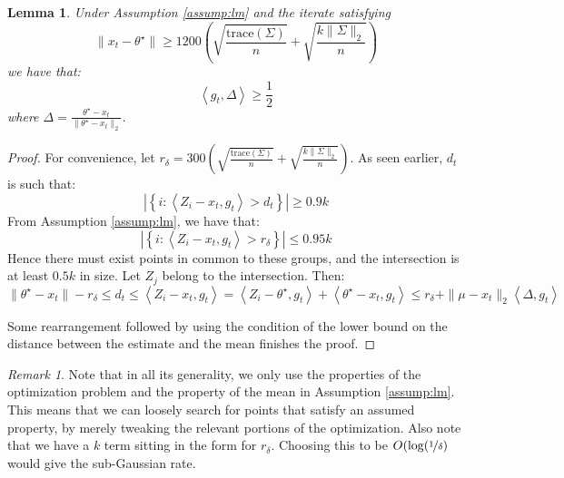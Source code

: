 \documentclass{article}
\newtheorem{lemma}{Lemma}
\theoremstyle{remark}
\newtheorem*{remark}{Remark}
\theoremstyle{defintiion}
\newcommand{\inner}[2]{\left\langle #1, #2 \right\rangle}
\newcommand{\trace}{\mathrm{trace}}
\newcommand{\tparam}{\theta^{\star}}
\begin{document}
\begin{lemma}
Under Assumption \ref{assump:lm} and the iterate satisfying
\begin{equation*}
\|x_{t} - \tparam\| \geq 1200\left(\sqrt{\frac{\trace(\Sigma)}{n}} + \sqrt{\frac{k\|\Sigma\|_{2}}{n}}\right)
\end{equation*}
we have that:
\begin{equation*}
\inner{g_{t}}{\Delta} \geq \frac{1}{2}
\end{equation*}
where \(\Delta = \frac{\tparam - x_{t}}{\|\tparam - x_{t}\|_{2}}\).
\end{lemma}

\begin{proof}
For convenience, let \(r_{\delta} = 300\left(\sqrt{\frac{\trace(\Sigma)}{n}} + \sqrt{\frac{k\|\Sigma\|_{2}}{n}}\right)\).
As seen earlier, \(d_{t}\) is such that:
\begin{equation*}
\left|\left\{i : \inner{Z_{i} - x_{t}}{g_{t}} > d_{t}\right\}\right| \geq 0.9k
\end{equation*}
From Assumption \ref{assump:lm}, we have that:
\begin{equation*}
\left|\left\{i : \inner{Z_{i} - x_{t}}{g_{t}} > r_{\delta}\right\}\right| \leq 0.95k
\end{equation*}
Hence there must exist points in common to these groups, and the intersection is at least \(0.5k\) in size. Let \(Z_{j}\) belong to the intersection. Then:
\begin{equation*}
\|\tparam - x_{t}\| - r_{\delta} \leq d_{t} \leq \inner{Z_{i} - x_{t}}{g_{t}} = \inner{Z_{i} - \tparam}{g_{t}} + \inner{\tparam - x_{t}}{g_{t}} \leq r_{\delta} + \|\mu - x_{t}\|_{2}\inner{\Delta}{g_{t}}
\end{equation*}

Some rearrangement followed by using the condition of the lower bound on the distance between the estimate and the mean finishes the proof.
\end{proof}

\begin{remark}
Note that in all its generality, we only use the properties of the optimization problem and the property of the mean in Assumption \ref{assump:lm}. This means that we can loosely search for points that satisfy an assumed property, by merely tweaking the relevant portions of the optimization. Also note that we have a \(k\) term sitting in the form for \(r_{\delta}\). Choosing this to be \(O(\log(\nicefrac{1}{\delta})\) would give the sub-Gaussian rate.
\end{remark}
\end{document}
